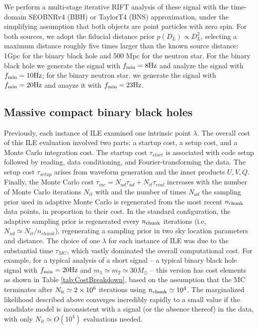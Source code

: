 \documentclass[twocolumn,prd,nofootinbib]{revtex4}
\newcommand\unit[1]{{\rm #1}}
\begin{document}
 We perform a multi-stage iterative RIFT analysis of these signal with the
time-domain SEOBNRv4 (BBH) or TaylorT4 (BNS) approximation, under the simplifying assumption that both objects are point particles with zero
spin.   For both sources, we adopt the fiducial distance prior $p(D_L) \propto D_L^2$,   selecting  a maximum distance
roughly five times larger than the known source distance: 1Gpc for the binary black hole and 500 Mpc for the neutron star.
For the binary black hole we generate the signal with $f_{\rm min}=8 \unit{Hz}$ and analyze the signal with  $f_{\rm
  min}=10 \unit{Hz}$; for the binary neutron star, we generate the signal with $f_{\rm min}=20\unit{Hz}$ and anayze it
with $f_{\rm min}=23\unit{Hz}$.

\subsection{Massive compact binary black holes}
Previously, each instance of ILE examined one intrinsic point $\lambda$.  The overall cost of this ILE evaluation
involved two parts: a startup cost, a setup cost, and a Monte Carlo integration cost.  The  startup cost $\tau_{start}$
is associated with code setup followed by reading, data conditioning, and Fourier-transforming the
data.  The setup cost $\tau_{setup}$ arises from waveform generation and  the inner products $U,V,Q$.  Finally, the Monte Carlo
cost $\tau_{mc}=N_{ad} \tau_{ad}+N_{it}\tau_{eval}$ increases with the number of Monte Carlo iterations $N_{it}$ with
and the number of times $N_{ad}$ the sampling prior used in adaptive Monte Carlo is regenerated from the most recent 
$n_{\rm chunk}$ data points, in proportion to their
cost.   In the standard configuration, the adaptive sampling prior is regenerated every $n_{\rm chunk}$ iterations (i.e,
 $N_{ad} \simeq N_{it}/n_{chunk}$), regenerating a sampling prior in two sky location parameters and distance.  
The choice of one $\lambda$ for each instance of ILE was due to the substantial time  $\tau_{MC}$, which vastly
dominated the overall computational cost.   For example, for a typical analysis of a short signal --  a typical binary
black hole signal with $f_{\rm min}=20 \unit{Hz}$ and $m_1\simeq m_2\simeq 30 M_\odot$ --  this version has
cost elements as shown in Table \ref{tab:CostBreakdown}, based on the assumption that the MC terminates after $N_{\rm it}\simeq 2\times 10^6$ iterations using
$n_{\rm chunk}\simeq 10^4$.  
The marginalized likelihood described above  converges incredibly rapidly to a small value if the candidate model is
inconsistent with a signal (or the absence thereof) in the data, with only $N_{it} \simeq O(10^4)$  evaluations needed.
\end{document}
